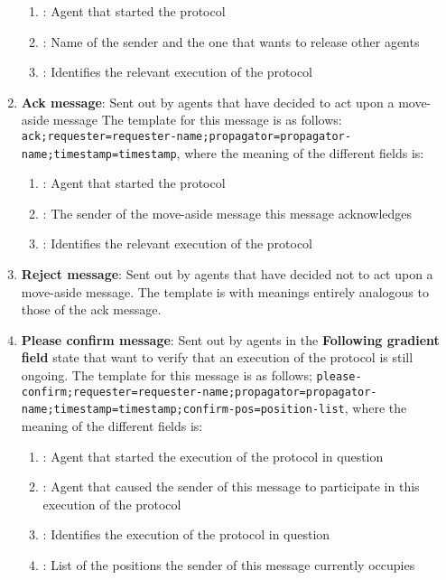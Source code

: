 \begin{enumerate}
        \begin{enumerate}
            \item {}: Agent that started the protocol
            \item {}: Name of the sender and the one that wants to release other agents
            \item {}: Identifies the relevant execution of the protocol
        \end{enumerate}
    \item \textbf{Ack message}: Sent out by agents that have decided to act upon a move-aside message
    The template for this message is as follows:
    \texttt{ack;requester=requester-name;propagator=propagator-name;timestamp=timestamp}, where the meaning of the different fields is:
        \begin{enumerate}
            \item {}: Agent that started the protocol
            \item {}: The sender of the move-aside message this message acknowledges
            \item {}: Identifies the relevant execution of the protocol
        \end{enumerate}
    \item \textbf{Reject message}: Sent out by agents that have decided not to act upon a move-aside message. The template is  with meanings entirely analogous to those of the ack message.
    \item \textbf{Please confirm message}: Sent out by agents in the \textbf{Following gradient field} state that want to verify that an execution of the protocol is still ongoing.
    The template for this message is as follows;
    \texttt{please-confirm;requester=requester-name;propagator=propagator-name;timestamp=timestamp;confirm-pos=position-list}, where the meaning of the different fields is:
        \begin{enumerate}
            \item {}: Agent that started the execution of the protocol in question
            \item {}: Agent that caused the sender of this message to participate in this execution of the protocol
            \item {}: Identifies the execution of the protocol in question
            \item {}: List of the positions the sender of this message currently occupies

\end{enumerate}
\end{enumerate}
